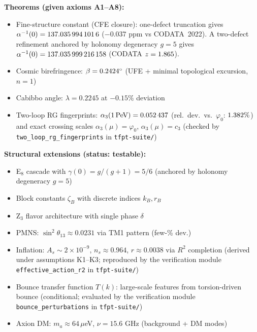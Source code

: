 \vspace{1em}
\begin{tcolorbox}[colback=gray!5, colframe=gray!60, title={\textbf{Claim Map: What This Paper Establishes}}, fonttitle=\bfseries]
\textbf{Theorems (given axioms A1--A8):}
\begin{itemize}[leftmargin=1.5em, topsep=2pt, itemsep=1pt]
    \item Fine-structure constant (CFE closure): one-defect truncation gives $\alpha^{-1}(0)=\num[round-mode=places,round-precision=10]{\TFPTalphaInvSelfNum}$ ($-0.037$ ppm vs CODATA~2022). A two-defect refinement anchored by holonomy degeneracy $g=5$ gives $\alpha^{-1}(0)=\num[round-mode=places,round-precision=12]{\TFPTalphaInvGOverFourNum}$ (CODATA $z=\num[round-mode=places,round-precision=3]{\TFPTalphaZGOverFourNum}$).
    \item Cosmic birefringence: $\beta = \num[round-mode=places,round-precision=4]{\TFPTbetaDegNum}^\circ$ (UFE + minimal topological excursion, $n=1$)
    \item Cabibbo angle: $\lambda = 0.2245$ at $-0.15\%$ deviation
    \item Two-loop RG fingerprints: $\alpha_3(1\,\mathrm{PeV})=\num[round-mode=places,round-precision=6]{\TFPTalphaThreePeVNum}$ (rel.\ dev.\ vs.\ $\varphi_0$: $\num[round-mode=places,round-precision=3]{\TFPTalphaThreePeVRelDevPercent}\%$) and exact crossing scales $\alpha_3(\mu)=\varphi_0$, $\alpha_3(\mu)=c_3$ (checked by \texttt{two\_loop\_rg\_fingerprints} in \texttt{tfpt-suite/})
\end{itemize}

\textbf{Structural extensions (status: testable):}
\begin{itemize}[leftmargin=1.5em, topsep=2pt, itemsep=1pt]
    \item E$_8$ cascade with $\gamma(0)=g/(g+1)=5/6$ (anchored by holonomy degeneracy $g=5$)
    \item Block constants $\zeta_B$ with discrete indices $k_B, r_B$
    \item Z$_3$ flavor architecture with single phase $\delta$
    \item PMNS: $\sin^2\theta_{13} \approx 0.0231$ via TM1 pattern (few-\% dev.)
    \item Inflation: $A_s \sim 2\times10^{-9}$, $n_s \approx 0.964$, $r \approx 0.0038$ via $R^2$ completion (derived under assumptions K1--K3; reproduced by the verification module \texttt{effective\_action\_r2} in \texttt{tfpt-suite/})
    \item Bounce transfer function $T(k)$: large-scale features from torsion-driven bounce (conditional; evaluated by the verification module \texttt{bounce\_perturbations} in \texttt{tfpt-suite/})
    \item Axion DM: $m_a \approx 64\,\mu$eV, $\nu = 15.6$ GHz (background + DM modes)
\end{itemize}


\end{tcolorbox}
